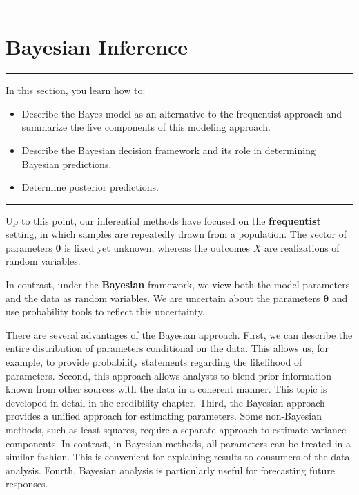 \documentclass[]{book}
\providecommand{\tightlist}{%
  \setlength{\itemsep}{0pt}\setlength{\parskip}{0pt}}
\theoremstyle{definition}
\theoremstyle{definition}
\theoremstyle{definition}
\theoremstyle{remark}
\begin{document}
\begin{center}\rule{0.5\linewidth}{\linethickness}\end{center}

\section{Bayesian Inference}\label{S:MS:BayesInference}

\begin{center}\rule{0.5\linewidth}{\linethickness}\end{center}

In this section, you learn how to:

\begin{itemize}
\tightlist
\item
  Describe the Bayes model as an alternative to the frequentist approach
  and summarize the five components of this modeling approach.
\item
  Describe the Bayesian decision framework and its role in determining
  Bayesian predictions.
\item
  Determine posterior predictions.
\end{itemize}

\begin{center}\rule{0.5\linewidth}{\linethickness}\end{center}

Up to this point, our inferential methods have focused on the
\textbf{frequentist} setting, in which samples are repeatedly drawn from
a population. The vector of parameters \(\boldsymbol \theta\) is fixed
yet unknown, whereas the outcomes \(X\) are realizations of random
variables.

In contrast, under the \textbf{Bayesian} framework, we view both the
model parameters and the data as random variables. We are uncertain
about the parameters \(\boldsymbol \theta\) and use probability tools to
reflect this uncertainty.

There are several advantages of the Bayesian approach. First, we can
describe the entire distribution of parameters conditional on the data.
This allows us, for example, to provide probability statements regarding
the likelihood of parameters. Second, this approach allows analysts to
blend prior information known from other sources with the data in a
coherent manner. This topic is developed in detail in the credibility
chapter. Third, the Bayesian approach provides a unified approach for
estimating parameters. Some non-Bayesian methods, such as least squares,
require a separate approach to estimate variance components. In
contrast, in Bayesian methods, all parameters can be treated in a
similar fashion. This is convenient for explaining results to consumers
of the data analysis. Fourth, Bayesian analysis is particularly useful
for forecasting future responses.
\end{document}
